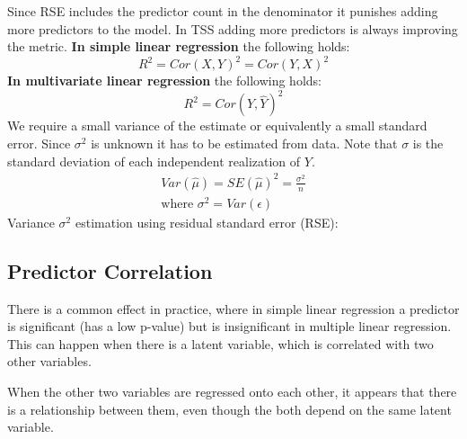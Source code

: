 \documentclass[../Main.tex]{subfiles}
\begin{document}
Since RSE includes the predictor count in the denominator it punishes adding more predictors to the model.
In TSS adding more predictors is always improving the metric.
\textbf{In simple linear regression} the following holds:
\begin{equation}
    R^2 = Cor(X,Y)^2 = Cor(Y,X)^2
\end{equation}
\textbf{In multivariate linear regression} the following holds:
\begin{equation}
    R^2 = Cor(Y,\hat{Y})^2
\end{equation}
We require a small variance of the estimate or equivalently a small standard error. Since \(\sigma^2\) is unknown it has to be estimated from data. Note that \(\sigma\) is the standard deviation of each independent realization of \(Y\).
\begin{equation}
    \begin{split}
         Var(\hat{\mu}) = SE(\hat{\mu})^2 = \frac{\sigma^2}{n}\\
         \text{where } \sigma^2 = Var(\epsilon)
    \end{split}
\end{equation}
Variance \(\sigma^2\) estimation using residual standard error (RSE):

\subsection{Predictor Correlation}
There is a common effect in practice, where in simple linear regression a predictor is significant (has a low p-value)
but is insignificant in multiple linear regression.
This can happen when there is a latent variable, which is correlated with two other variables.

When the other two variables are 
regressed onto each other, it appears 
that there is a relationship between 
them, even though the both depend 
on the same latent variable.

\end{document}
